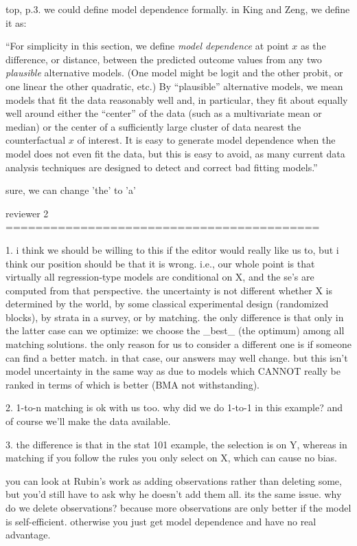 top, p.3. we could define model dependence formally.  in King and
Zeng, we define it as:

``For simplicity in this section, we define \emph{model dependence} at
point $x$ as the difference, or distance, between the predicted
outcome values from any two \emph{plausible} alternative models.  (One
model might be logit and the other probit, or one linear the other
quadratic, etc.)  By ``plausible'' alternative models, we mean models
that fit the data reasonably well and, in particular, they fit about
equally well around either the ``center'' of the data (such as a
multivariate mean or median) or the center of a sufficiently large
cluster of data nearest the counterfactual $x$ of interest. It is easy
to generate model dependence when the model does not even fit the
data, but this is easy to avoid, as many current data analysis
techniques are designed to detect and correct bad fitting models.''

sure, we can change 'the' to 'a'

reviewer 2 ==========================================

1. i think we should be willing to this if the editor would really
like us to, but i think our position should be that it is wrong.
i.e., our whole point is that virtually all regression-type models are
conditional on X, and the se's are computed from that perspective.  the
uncertainty is not different whether X is determined by the world, by
some classical experimental design (randomized blocks), by strata in a
survey, or by matching.  the only difference is that only in the
latter case can we optimize: we choose the _best_ (the optimum) among
all matching solutions.  the only reason for us to consider a
different one is if someone can find a better match.  in that case,
our answers may well change.  but this isn't model uncertainty in the
same way as due to models which CANNOT really be ranked in terms of
which is better (BMA not withstanding).

2. 1-to-n matching is ok with us too.  why did we do 1-to-1 in this
example?  and of course we'll make the data available.

3.  the difference is that in the stat 101 example, the selection is
on Y, whereas in matching if you follow the rules you only select on
X, which can cause no bias.

you can look at Rubin's work as adding observations rather than
deleting some, but you'd still have to ask why he doesn't add them
all.  its the same issue.  why do we delete observations?  because
more observations are only better if the model is self-efficient.
otherwise you just get model dependence and have no real advantage.

